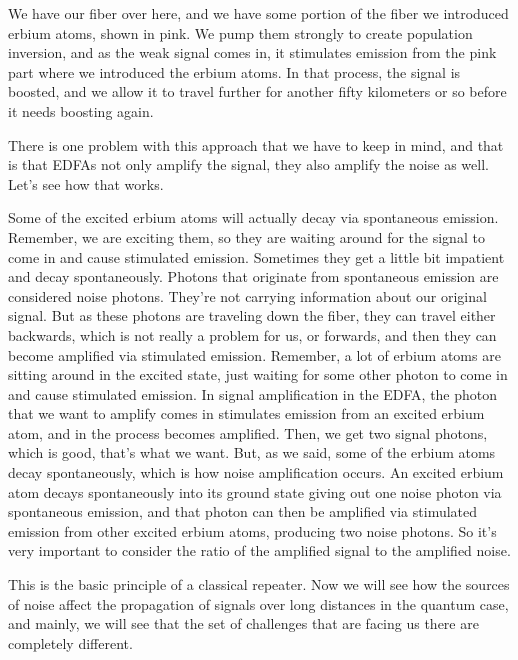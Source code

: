 We have our fiber over here, and we have some portion of the fiber we introduced erbium atoms, shown in pink. We pump them strongly to create population inversion, and as the weak signal comes in, it stimulates emission from the pink part where we introduced the erbium atoms. In that process, the signal is boosted, and we allow it to travel further for another fifty kilometers or so before it needs boosting again.


There is one problem with this approach that we have to keep in mind, and that is that EDFAs not only amplify the signal, they also amplify the noise as well. Let's see how that works.

Some of the excited erbium atoms will actually decay via spontaneous emission. Remember, we are exciting them, so they are waiting around for the signal to come in and cause stimulated emission. Sometimes they get a little bit impatient and decay spontaneously. Photons that originate from spontaneous emission are considered noise photons. They're not carrying information about our original signal. But as these photons are traveling down the fiber, they can travel either backwards, which is not really a problem for us, or forwards, and then they can become amplified via stimulated emission. Remember, a lot of erbium atoms are sitting around in the excited state, just waiting for some other photon to come in and cause stimulated emission. In signal amplification in the EDFA, the photon that we want to amplify comes in stimulates emission from an excited erbium atom, and in the process becomes amplified. Then, we get two signal photons, which is good, that's what we want. But, as we said, some of the erbium atoms decay spontaneously, which is how noise amplification occurs. An excited erbium atom decays spontaneously into its ground state giving out one noise photon via spontaneous emission, and that photon can then be amplified via stimulated emission from other excited erbium atoms, producing two noise photons. So it's very important to consider the ratio of the amplified signal to the amplified noise.

This is the basic principle of a classical repeater. Now we will see how the sources of noise affect the propagation of signals over long distances in the quantum case, and mainly, we will see that the set of challenges that are facing us there are completely different.



